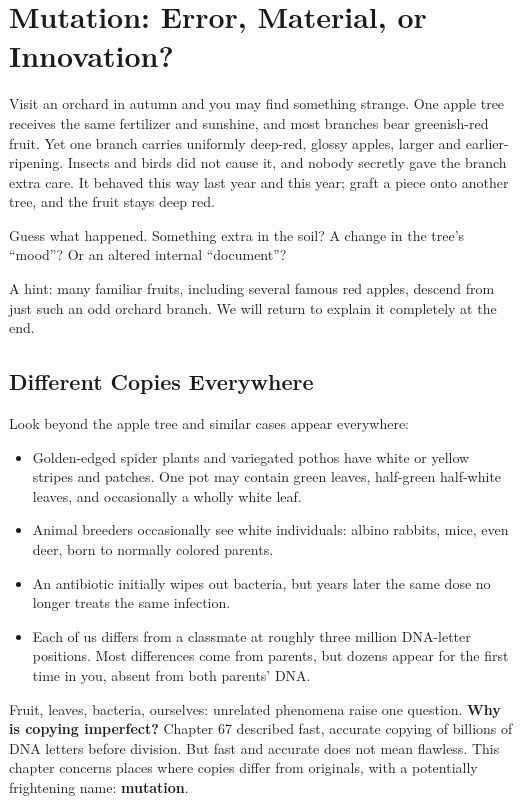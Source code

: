 \chapter{Mutation: Error, Material, or Innovation?}

\begin{kaichang}
Visit an orchard in autumn and you may find something strange. One apple tree receives the same fertilizer and sunshine, and most branches bear greenish-red fruit. Yet one branch carries uniformly deep-red, glossy apples, larger and earlier-ripening. Insects and birds did not cause it, and nobody secretly gave the branch extra care. It behaved this way last year and this year; graft a piece onto another tree, and the fruit stays deep red.

Guess what happened. Something extra in the soil? A change in the tree's ``mood''? Or an altered internal ``document''?

A hint: many familiar fruits, including several famous red apples, descend from just such an odd orchard branch. We will return to explain it completely at the end.
\end{kaichang}

\section{Different Copies Everywhere}

Look beyond the apple tree and similar cases appear everywhere:

\begin{itemize}[itemsep=2pt]
\item Golden-edged spider plants and variegated pothos have white or yellow stripes and patches. One pot may contain green leaves, half-green half-white leaves, and occasionally a wholly white leaf.
\item Animal breeders occasionally see white individuals: albino rabbits, mice, even deer, born to normally colored parents.
\item An antibiotic initially wipes out bacteria, but years later the same dose no longer treats the same infection.
\item Each of us differs from a classmate at roughly three million DNA-letter positions. Most differences come from parents, but dozens appear for the first time in you, absent from both parents' DNA.
\end{itemize}

Fruit, leaves, bacteria, ourselves: unrelated phenomena raise one question. \textbf{Why is copying imperfect?} Chapter 67 described fast, accurate copying of billions of DNA letters before division. But fast and accurate does not mean flawless. This chapter concerns places where copies differ from originals, with a potentially frightening name: \textbf{mutation}.

